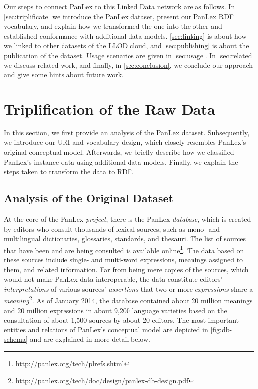 \documentclass[sw]{iosart2c}
\begin{document}
Our steps to connect PanLex to this Linked Data network are as follows.
In \autoref{sec:triplificate} we introduce the PanLex dataset, present our
PanLex RDF vocabulary, and explain how we transformed the one into the other and established conformance with additional data models.
\autoref{sec:linking} is about how we linked to other datasets of the LLOD cloud,
and \autoref{sec:publishing} is about the publication of the dataset.
Usage scenarios are given in \autoref{sec:usage}.
In \autoref{sec:related} we discuss related work, and finally, in \autoref{sec:conclusion}, we conclude our approach and give some hints about future work.

\section{Triplification of the Raw Data}
\label{sec:triplificate}
In this section, we first provide an analysis of the PanLex dataset.
Subsequently, we introduce our URI and vocabulary design, which closely
resembles PanLex's original conceptual model.
Afterwards, we briefly describe how we classified PanLex's
instance data using additional data models. Finally, we explain the steps
taken to transform the data to RDF.


\subsection{Analysis of the Original Dataset}
\label{sec:analysis}
At the core of the PanLex \emph{project}, there is the PanLex \emph{database}, which is created by editors who consult thousands of lexical sources, such as mono- and multilingual dictionaries, glossaries, standards, and thesauri.
The list of sources that have been and are being consulted is available online\footnote{\url{http://panlex.org/tech/plrefs.shtml}}.
The data based on these sources include single- and multi-word expressions, meanings assigned to them, and related information. Far from being mere copies of the sources, which would not make PanLex data interoperable, the data constitute editors' \emph{interpretations} of various sources' \emph{assertions} that two or more \emph{expressions} share a \emph{meaning}\footnote{\url{http://panlex.org/tech/doc/design/panlex-db-design.pdf}}.
As of January 2014, the database contained about 20 million meanings and 20 million expressions in about 9,200 language varieties based on the consultation of about 1,500 sources by about 20 editors.
The most important entities and relations of PanLex's conceptual model are depicted in \autoref{fig:db-schema} and are explained in more detail below.
\end{document}
